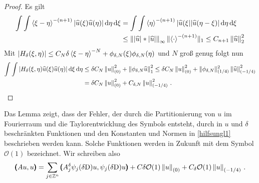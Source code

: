 \begin{proof}
Es gilt
\begin{align*}
\int\int\braket{\xi-\eta}^{-(n+1)}|\widehat u(\xi)\widehat u(\eta)|\,\mathrm d\eta\,\mathrm d\xi &= \int\int \braket{\eta}^{-(n+1)}|\widehat{u}(\xi||\widehat u(\eta-\xi)|\,\mathrm d\eta\,\mathrm d\xi\\
&\le \left\lVert\lvert\widehat u\rvert * \lvert\widehat u\rvert\right\rVert_\infty \lVert\braket{\cdot}^{-(n+1)}\rVert_1\le C_{n+1} \left\lVert\widehat u\right\rVert_2^2
\end{align*}
Mit $|H_\delta(\xi,\eta)|\le C_N\delta\braket{\xi-\eta}^{-N} +\phi_{\delta,N}(\xi)\phi_{\delta,N}(\eta)$ und $N$ groß genug folgt nun
\begin{align*}
\int\int|H_\delta(\xi,\eta)\widehat u(\xi)\widehat u(\eta)|\,\mathrm d\xi\,\mathrm d\eta &\le \delta C_N \left\lVert u\right\rVert^2_{(0)} + \left\lVert\phi_{\delta,N} \widehat u\right\rVert_1^2 \le \delta C_N \left\lVert u\right\rVert^2_{(0)} + \|\phi_{\delta,N}\|_{(1/4)}^2 \left\lVert\widehat u\right\rVert_{(-1/4)}^2 \\
&= \delta C_N \left\lVert u\right\rVert^2_{(0)} +  C_{\delta,N} \left\lVert u\right\rVert_{(-1/4)}^2\,.
\end{align*}

\end{proof}

Das Lemma zeigt, dass der Fehler, der durch die Partitionierung von $u$ im Fourierraum und die Taylorentwicklung des Symbols entsteht, durch in $u$ und $\delta$ beschränkten Funktionen und den Konstanten und Normen in \eqref{hilfsungl1} beschrieben werden kann. Solche Funktionen werden in Zukunft mit dem Symbol $\mathcal O(1)$ bezeichnet. Wir schreiben also
\begin{align*}
\pmb(Au,u\pmb) = \sum_{j\in\mathbb Z^n} \pmb(A_j^\delta \psi_j(\delta\mathrm D)u,\psi_j(\delta\mathrm D)u\pmb) + C\delta \mathcal{O}(1) \left\lVert u\right\rVert_{(0)} + C_\delta \mathcal O(1)\left\lVert u\right\rVert_{(-1/4)}\,.
\end{align*}

